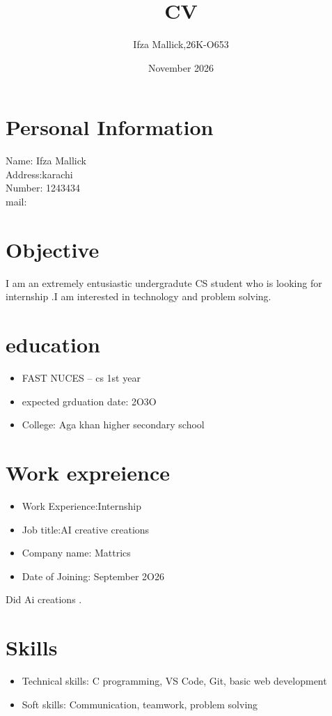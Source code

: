 \documentclass{article}
\title{CV}
\author{Ifza Mallick,26K-O653 }
\date{November 2026}
\begin{document}
\maketitle

\section{Personal Information}
Name: Ifza Mallick\\
Address:karachi\\
Number: 1243434\\
mail:\href{mallickifza11@gmail.com}\\
\section{Objective}
I am an extremely entusiastic undergradute CS student who is looking for internship .I am interested in technology and problem solving.

\section{education}
\begin{itemize}
    \item FAST NUCES -- cs 1st year 
    \item expected grduation date: 2O3O
    \item College: Aga khan higher secondary school
    \
\end{itemize}
    
\section{Work expreience}
\begin{itemize}
    \item Work Experience:Internship
    \item Job title:AI creative creations
    \item Company name: Mattrics
    \item Date of Joining: September 2O26
    \end{itemize}
    Did Ai creations .

\section{Skills}
\begin{itemize}
    \item Technical skills: C programming, VS Code, Git, basic web development
    \item Soft skills: Communication, teamwork, problem solving
\end{itemize}
\end{document}
